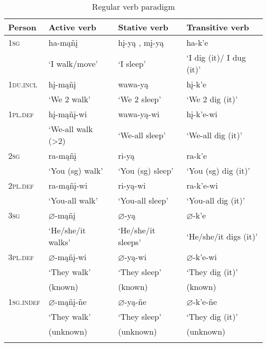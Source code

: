 \documentclass[output=paper]{LSP/langsci}
\begin{document}
\begin{table}
\begin{tabular}{l l l l }
\lsptoprule
Person	& Active verb & Stative verb & Transitive verb \\
\midrule
\textsc{1sg} 	& ha-m\k{a}ñ\k{i} & h\k{i}-y\k{a} , m\k{i}-y\k{a} & ha-k'e \\
& `I walk/move'	& `I sleep'	 & `I dig (it)/ I dug (it)' \\

\textsc{1du.incl} & h\k{i}-m\k{a}ñ\k{i} & wawa-y\k{a} & h\k{i}-k'e \\
 & `We 2 walk'	 & `We 2 sleep' & `We 2 dig (it)' \\

\textsc{1pl.def}  & h\k{i}-m\k{a}ñ\k{i}-wi & wawa-y\k{a}-wi & h\k{i}-k'e-wi \\
 & `We-all walk (>2)  & `We-all sleep' & `We-all dig (it)' \\

\textsc{2sg}	& ra-m\k{a}ñ\k{i} &  ri-y\k{a} & ra-k'e \\
& `You (sg) walk'	 & `You (sg) sleep' & `You (sg) dig (it)' \\

\textsc{2pl.def} & ra-m\k{a}ñ\k{i}-wi & ri-y\k{a}-wi & ra-k'e-wi \\
 & `You-all walk' & `You-all sleep' & `You-all dig (it)' \\

\textsc{3sg} & $\varnothing$-m\k{a}ñ\k{i} & $\varnothing$-y\k{a} & $\varnothing$-k'e \\
& `He/she/it walks' & `He/she/it sleeps'	 & `He/she/it digs (it)' \\

\textsc{3pl.def} & $\varnothing$-m\k{a}ñ\k{i}-wi & $\varnothing$-y\k{a}-wi & $\varnothing$-k'e-wi \\
 & `They walk'  & `They sleep'  & `They dig (it)'  \\
& (known) & (known) & (known) \\

\textsc{1sg.indef} & $\varnothing$-m\k{a}ñ\k{i}-ñe & $\varnothing$-y\k{a}-ñe & $\varnothing$-k'e-ñe \\
 & `They walk'	& `They sleep' &`They dig (it)'  \\
& (unknown) & (unknown) & (unknown) \\
\lspbottomrule
\end{tabular}
\caption{Regular verb paradigm} \label{regularverb}
\end{table}
\end{document}
